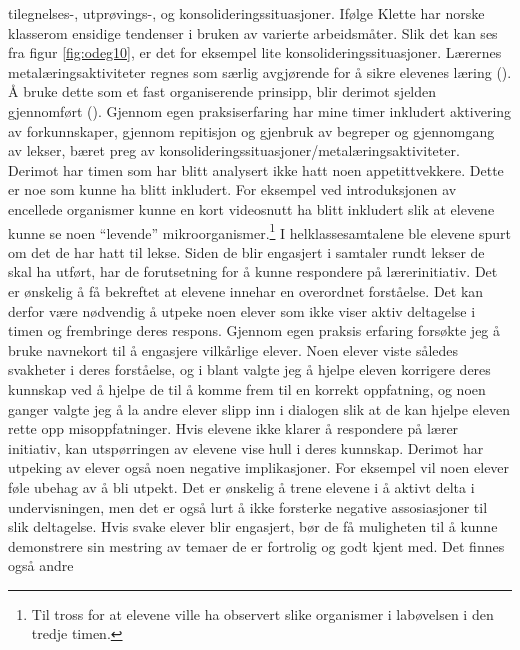 \documentclass[main.tex]{subfiles}
\begin{document}
tilegnelses-, utprøvings-, og konsolideringssituasjoner. Ifølge Klette har norske klasserom ensidige 
tendenser i bruken av varierte arbeidsmåter. Slik det kan ses fra figur \ref{fig:odeg10}, er det for 
eksempel lite konsolideringssituasjoner. Lærernes metalæringsaktiviteter regnes som særlig 
avgjørende for å sikre elevenes læring (). Å bruke dette som et fast
organiserende prinsipp, blir derimot sjelden gjennomført (). Gjennom egen praksiserfaring
har mine timer inkludert aktivering av forkunnskaper, gjennom repitisjon og gjenbruk av begreper 
og gjennomgang av lekser, bæret preg av konsolideringssituasjoner/metalæringsaktiviteter. Derimot
har timen som har blitt analysert ikke hatt noen appetittvekkere. Dette er noe som kunne ha blitt 
inkludert. For eksempel ved introduksjonen av encellede organismer kunne en kort videosnutt ha blitt
inkludert slik at elevene kunne se noen ``levende'' mikroorganismer.\footnote[3]{Til tross for at 
elevene ville ha observert slike organismer i labøvelsen i den tredje timen.}  
\newline
\newline
I helklassesamtalene ble elevene spurt om det de har hatt til lekse.
Siden de blir engasjert i samtaler rundt lekser de skal ha utført, har de forutsetning for å kunne 
respondere på lærerinitiativ. Det er ønskelig å få bekreftet at elevene innehar en overordnet 
forståelse. Det kan derfor være nødvendig å utpeke noen elever som ikke viser aktiv deltagelse i 
timen og frembringe deres respons. Gjennom egen praksis erfaring forsøkte jeg å bruke navnekort
til å engasjere vilkårlige elever. Noen elever viste således svakheter i deres forståelse,
og i blant valgte jeg å hjelpe eleven korrigere deres kunnskap ved å hjelpe de til å komme
frem til en korrekt oppfatning, og noen ganger valgte jeg å la andre elever slipp inn i dialogen
slik at de kan hjelpe eleven rette opp misoppfatninger.
\newline
\newline
Hvis elevene ikke klarer å respondere på lærer initiativ, kan 
utspørringen av elevene vise hull i deres kunnskap. Derimot har utpeking av elever også noen 
negative implikasjoner. For eksempel vil noen elever føle ubehag av å bli utpekt. Det er ønskelig å 
trene elevene i å aktivt delta i undervisningen, men det er også lurt å ikke forsterke negative 
assosiasjoner til slik deltagelse. Hvis svake elever blir engasjert, bør de få muligheten til å 
kunne demonstrere sin mestring av temaer de er fortrolig og godt kjent med. Det finnes også andre 
\end{document}

